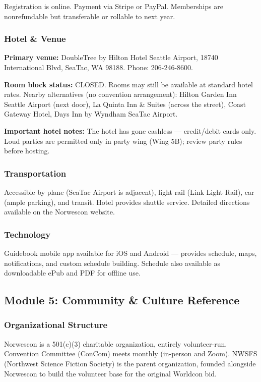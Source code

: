 \documentclass[11pt,letterpaper]{article}
\begin{document}
Registration is online. Payment via Stripe or PayPal. Memberships are nonrefundable but transferable or rollable to next year.

\subsubsection{Hotel \& Venue}

\textbf{Primary venue:} DoubleTree by Hilton Hotel Seattle Airport, 18740 International Blvd, SeaTac, WA 98188. Phone: 206-246-8600.

\textbf{Room block status:} CLOSED. Rooms may still be available at standard hotel rates. Nearby alternatives (no convention arrangement): Hilton Garden Inn Seattle Airport (next door), La Quinta Inn \& Suites (across the street), Coast Gateway Hotel, Days Inn by Wyndham SeaTac Airport.

\textbf{Important hotel notes:} The hotel has gone cashless --- credit/debit cards only. Loud parties are permitted only in party wing (Wing 5B); review party rules before hosting.

\subsubsection{Transportation}

Accessible by plane (SeaTac Airport is adjacent), light rail (Link Light Rail), car (ample parking), and transit. Hotel provides shuttle service. Detailed directions available on the Norwescon website.

\subsubsection{Technology}

Guidebook mobile app available for iOS and Android --- provides schedule, maps, notifications, and custom schedule building. Schedule also available as downloadable ePub and PDF for offline use.

\subsection{Module 5: Community \& Culture Reference}

\subsubsection{Organizational Structure}

Norwescon is a 501(c)(3) charitable organization, entirely volunteer-run. Convention Committee (ConCom) meets monthly (in-person and Zoom). NWSFS (Northwest Science Fiction Society) is the parent organization, founded alongside Norwescon to build the volunteer base for the original Worldcon bid.
\end{document}
